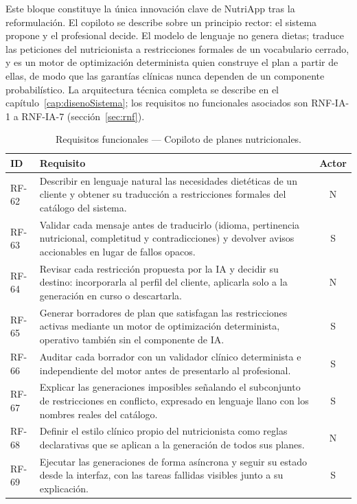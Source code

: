 Este bloque constituye la única innovación clave de NutriApp tras la reformulación. El copiloto se describe sobre un principio rector: el sistema propone y el profesional decide. El modelo de lenguaje no genera dietas; traduce las peticiones del nutricionista a restricciones formales de un vocabulario cerrado, y es un motor de optimización determinista quien construye el plan a partir de ellas, de modo que las garantías clínicas nunca dependen de un componente probabilístico. La arquitectura técnica completa se describe en el capítulo~\ref{cap:disenoSistema}; los requisitos no funcionales asociados son RNF-IA-1 a RNF-IA-7 (sección~\ref{sec:rnf}).

\begin{table}[htbp]
\centering
\small
\begin{tabular}{|l|p{10.5cm}|c|}
\hline
\textbf{ID} & \textbf{Requisito} & \textbf{Actor} \\
\hline
RF-62 & Describir en lenguaje natural las necesidades dietéticas de un cliente y obtener su traducción a restricciones formales del catálogo del sistema. & N \\
\hline
RF-63 & Validar cada mensaje antes de traducirlo (idioma, pertinencia nutricional, completitud y contradicciones) y devolver avisos accionables en lugar de fallos opacos. & S \\
\hline
RF-64 & Revisar cada restricción propuesta por la IA y decidir su destino: incorporarla al perfil del cliente, aplicarla solo a la generación en curso o descartarla. & N \\
\hline
RF-65 & Generar borradores de plan que satisfagan las restricciones activas mediante un motor de optimización determinista, operativo también sin el componente de IA. & S \\
\hline
RF-66 & Auditar cada borrador con un validador clínico determinista e independiente del motor antes de presentarlo al profesional. & S \\
\hline
RF-67 & Explicar las generaciones imposibles señalando el subconjunto de restricciones en conflicto, expresado en lenguaje llano con los nombres reales del catálogo. & S \\
\hline
RF-68 & Definir el estilo clínico propio del nutricionista como reglas declarativas que se aplican a la generación de todos sus planes. & N \\
\hline
RF-69 & Ejecutar las generaciones de forma asíncrona y seguir su estado desde la interfaz, con las tareas fallidas visibles junto a su explicación. & S \\
\hline
\end{tabular}
\caption{Requisitos funcionales --- Copiloto de planes nutricionales.}
\label{tab:rf-copiloto}
\end{table}

